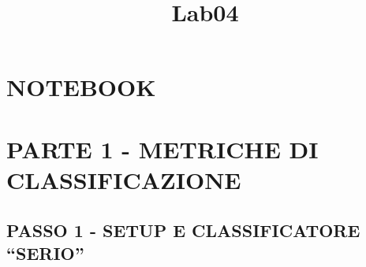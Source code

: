 \documentclass[11pt]{article}
\title{Lab04}
\begin{document}
    
    \maketitle
    
    

    
    \hypertarget{notebook}{%
\section{NOTEBOOK}\label{notebook}}

\hypertarget{parte-1---metriche-di-classificazione}{%
\section{PARTE 1 - METRICHE DI
CLASSIFICAZIONE}\label{parte-1---metriche-di-classificazione}}

\hypertarget{passo-1---setup-e-classificatore-serio}{%
\subsection{PASSO 1 - SETUP E CLASSIFICATORE
``SERIO''}\label{passo-1---setup-e-classificatore-serio}}
\end{document}
